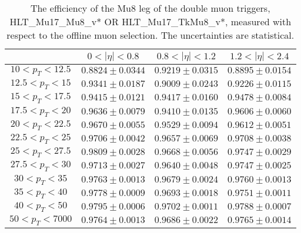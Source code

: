 \begin{table}[!ht]
\begin{center}
\begin{tabular}{c|c|c|c}
\hline & $0 < |\eta| < 0.8$ & $0.8 < |\eta| < 1.2$ & $1.2 < |\eta| < 2.4$  \\
\hline
$ 10 < p_T < 12.5$ & $0.8824 \pm 0.0344$ & $0.9219 \pm 0.0315$ & $0.8895 \pm 0.0154$  \\
$12.5 < p_T <  15$ & $0.9341 \pm 0.0187$ & $0.9009 \pm 0.0243$ & $0.9226 \pm 0.0115$  \\
$ 15 < p_T < 17.5$ & $0.9415 \pm 0.0121$ & $0.9417 \pm 0.0160$ & $0.9478 \pm 0.0084$  \\
$17.5 < p_T <  20$ & $0.9636 \pm 0.0079$ & $0.9410 \pm 0.0135$ & $0.9606 \pm 0.0060$  \\
$ 20 < p_T < 22.5$ & $0.9670 \pm 0.0055$ & $0.9529 \pm 0.0094$ & $0.9612 \pm 0.0051$  \\
$22.5 < p_T <  25$ & $0.9706 \pm 0.0042$ & $0.9657 \pm 0.0069$ & $0.9708 \pm 0.0038$  \\
$ 25 < p_T < 27.5$ & $0.9809 \pm 0.0028$ & $0.9668 \pm 0.0056$ & $0.9747 \pm 0.0029$  \\
$27.5 < p_T <  30$ & $0.9713 \pm 0.0027$ & $0.9640 \pm 0.0048$ & $0.9747 \pm 0.0025$  \\
$ 30 < p_T <  35$ & $0.9763 \pm 0.0013$ & $0.9679 \pm 0.0024$ & $0.9760 \pm 0.0013$  \\
$ 35 < p_T <  40$ & $0.9778 \pm 0.0009$ & $0.9693 \pm 0.0018$ & $0.9751 \pm 0.0011$  \\
$ 40 < p_T <  50$ & $0.9795 \pm 0.0006$ & $0.9702 \pm 0.0011$ & $0.9788 \pm 0.0007$  \\
$ 50 < p_T < 7000$ & $0.9764 \pm 0.0013$ & $0.9686 \pm 0.0022$ & $0.9765 \pm 0.0014$  \\
\hline
\hline
\end{tabular}
\caption{The efficiency of the Mu8 leg of the double muon triggers,
HLT\_Mu17\_Mu8\_v* OR HLT\_Mu17\_TkMu8\_v*,
measured with respect to the offline muon selection. 
The uncertainties are statistical.}
\label{tab:eff_muon_trail_dbl}
\end{center}
\end{table}


